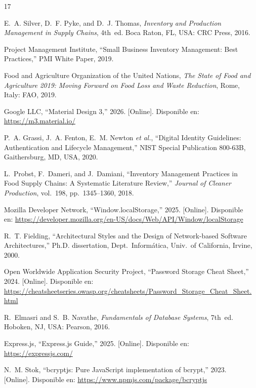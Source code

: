 \documentclass[journal]{IEEEtran}
\begin{document}
	\begin{thebibliography}{17}
		
		E.~A. Silver, D.~F. Pyke, and D.~J. Thomas,
		\emph{Inventory and Production Management in Supply Chains},
		4th~ed.
		Boca Raton, FL, USA: CRC Press, 2016.
		
		Project Management Institute,
		``Small Business Inventory Management: Best Practices,''
		PMI White Paper, 2019.
		
		Food and Agriculture Organization of the United Nations,
		\emph{The State of Food and Agriculture 2019: Moving Forward on
			Food Loss and Waste Reduction},
		Rome, Italy: FAO, 2019.
		
		Google LLC,
		``Material Design 3,'' 2026.
		[Online]. Disponible en: \url{https://m3.material.io/}
		
		P.~A. Grassi, J.~A. Fenton, E.~M. Newton \emph{et al.},
		``Digital Identity Guidelines: Authentication and Lifecycle
		Management,''
		NIST Special Publication 800-63B, Gaithersburg, MD, USA, 2020.
		
		L.~Probst, F.~Dameri, and J.~Damiani,
		``Inventory Management Practices in Food Supply Chains:
		A Systematic Literature Review,''
		\emph{Journal of Cleaner Production}, vol.~198, pp.~1345--1360, 2018.
		
		Mozilla Developer Network,
		``Window.localStorage,'' 2025.
		[Online]. Disponible en: \url{https://developer.mozilla.org/en-US/docs/Web/API/Window/localStorage}
		
		R.~T. Fielding,
		``Architectural Styles and the Design of Network-based Software
		Architectures,''
		Ph.D. dissertation, Dept.~Informática, Univ.~of California, Irvine, 2000.
		
		Open Worldwide Application Security Project,
		``Password Storage Cheat Sheet,'' 2024.
		[Online]. Disponible en: \url{https://cheatsheetseries.owasp.org/cheatsheets/Password_Storage_Cheat_Sheet.html}
		
		R.~Elmasri and S.~B. Navathe,
		\emph{Fundamentals of Database Systems}, 7th~ed.
		Hoboken, NJ, USA: Pearson, 2016.
		
		Express.js,
		``Express.js Guide,'' 2025.
		[Online]. Disponible en: \url{https://expressjs.com/}
		
		N.~M. Stok,
		``bcryptjs: Pure JavaScript implementation of bcrypt,'' 2023.
		[Online]. Disponible en: \url{https://www.npmjs.com/package/bcryptjs}
		

\end{thebibliography}
\end{document}
